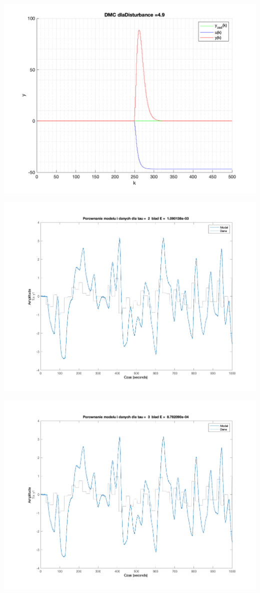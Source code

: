 \documentclass[a4paper, 11pt]{article}
\begin{document}
\begin{enumerate}
 \includegraphics[width=\linewidth]{./ModelsP4_Disturbance/P4_DMC_Disturbance_4_9_png.png} 
 
 \includegraphics[width=\linewidth]{./ModelsP1/modelTau2.png} 
 
 \includegraphics[width=\linewidth]{./ModelsP1/modelTau3.png} 
 

\end{enumerate}
\end{document}
